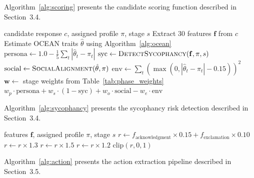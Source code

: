 \documentclass[12pt, a4paper]{report}
\begin{document}
Algorithm~\ref{alg:scoring} presents the candidate scoring function described in Section~3.4.

\begin{algorithm}[ht]
\caption{Candidate Scoring Function}
\label{alg:scoring}
\begin{algorithmic}[1]
\Require candidate response $c$, assigned profile $\pi$, stage $s$
\State Extract 30 features $\mathbf{f}$ from $c$
\State Estimate OCEAN traits $\hat{\theta}$ using Algorithm~\ref{alg:ocean}
\State $\text{persona} \gets 1.0 - \frac{1}{5}\sum_{t} |\hat{\theta}_t - \pi_t|$
\State $\text{syc} \gets \textsc{DetectSycophancy}(\mathbf{f}, \pi, s)$ 
\State $\text{social} \gets \textsc{SocialAlignment}(\hat{\theta}, \pi)$
\State $\text{env} \gets \sum_{t} (\max(0, |\hat{\theta}_t - \pi_t| - 0.15))^2$
\State $\mathbf{w} \gets$ stage weights from Table~\ref{tab:phase_weights}
\State \Return $w_p \cdot \text{persona} + w_s \cdot (1-\text{syc}) + w_o \cdot \text{social} - w_e \cdot \text{env}$
\end{algorithmic}
\end{algorithm}

Algorithm~\ref{alg:sycophancy} presents the sycophancy risk detection described in Section~3.4.

\begin{algorithm}[ht]
\caption{Sycophancy Risk Detection}
\label{alg:sycophancy}
\begin{algorithmic}[1]
\Require features $\mathbf{f}$, assigned profile $\pi$, stage $s$
\State $r \gets f_{\text{acknowledgment}} \times 0.15 + f_{\text{exclamation}} \times 0.10$ 
    \State $r \gets r \times 1.3$ 
\EndIf
{}
    \State $r \gets r \times 1.5$ 
\EndIf
{}
    \State $r \gets r \times 1.2$ 
\EndIf
\State \Return $\text{clip}(r, 0, 1)$
\end{algorithmic}
\end{algorithm}

Algorithm~\ref{alg:action} presents the action extraction pipeline described in Section~3.5.
\end{document}
